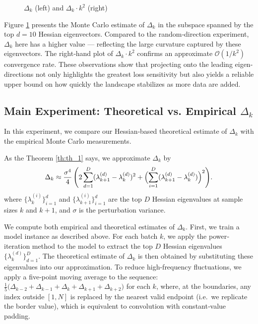 \documentclass{article}
\begin{document}
\begin{figure}[!htbp]
  \hspace*{-2.6cm}
  \caption{$\Delta_k$ (left) and $\Delta_k \cdot k^2$ (right)}
  \label{fig:delta_eigen}
\end{figure}

Figure \ref{fig:delta_eigen} presents the Monte Carlo estimate of $\Delta_k$ in the subspace spanned by the top $d = 10$
Hessian eigenvectors. Compared to the random‐direction experiment, $\Delta_k$ here has a higher value --- reflecting the
large curvature captured by these eigenvectors. The right‐hand plot of $\Delta_k\cdot k^2$
confirms an approximate $\mathcal O(1 / k^2)$ convergence rate. These observations show that projecting onto the leading eigen-directions not only
highlights the greatest loss sensitivity but also yields a reliable upper bound on how quickly the landscape stabilizes as more data are
added.

\subsection{Main Experiment: Theoretical vs. Empirical \texorpdfstring{$\Delta_k$}{Delta k}}\label{sec:exp:main}

In this experiment, we compare our Hessian‐based theoretical estimate of $\Delta_k$ with the empirical Monte Carlo measurements.

As the Theorem \ref{th:th_1} says, we approximate $\Delta_k$ by
$$
  \Delta_k \approx
  \frac{\sigma^4}{4}\, \Biggl( 2 \sum_{d=1}^D (\lambda_{k+1}^{(d)} - \lambda_k^{(d)})^2
  + \Bigl( \sum_{i=1}^D (\lambda_{k+1}^{(d)} - \lambda_k^{(d)}) \Bigr)^2 \Biggr).
$$
where $\{\lambda_k^{(i)}\}_{i=1}^d$ and $\{\lambda_{k+1}^{(i)}\}_{i=1}^d$ are the top $D$ Hessian eigenvalues at sample sizes $k$ and $k + 1$,
and $\sigma$ is the perturbation variance.

We compute both empirical and theoretical estimates of $\Delta_k$. First, we train a model instance as described above.
For each batch $k$, we apply the power‐iteration method to the model to extract the top $D$ Hessian eigenvalues
$\{\lambda_k^{(d)}\}_{d=1}^D$. The theoretical estimate of $\Delta_k$ is then obtained by substituting these eigenvalues into our
approximation. To reduce high-frequency fluctuations, we apply a five‐point moving average to the sequence:
$\frac{1}{5}\bigl(\Delta_{k-2} + \Delta_{k-1} + \Delta_k + \Delta_{k+1} + \Delta_{k+2}\bigr)$ for each $k$,
where, at the boundaries, any index outside $[1,N]$ is replaced by the nearest valid endpoint (i.e.\ we replicate the border value),
which is equivalent to convolution with constant‐value padding.
\end{document}
